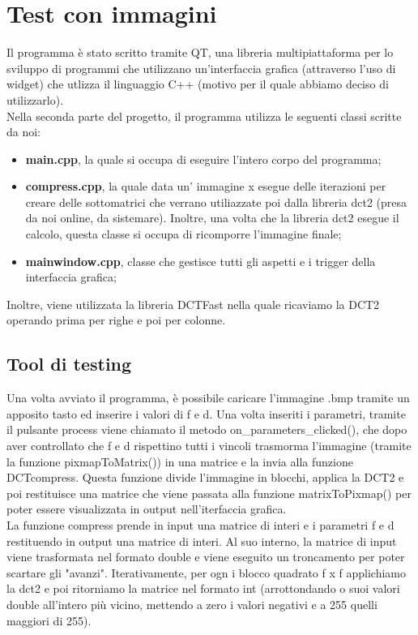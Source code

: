 \documentclass[a4paper,12pt]{report}
\newcommand{\mychapter}[2]{
    \setcounter{chapter}{#1}
    \setcounter{section}{0}
    \chapter*{#2}
    \addcontentsline{toc}{chapter}{#2}
}
\begin{document}
\mychapter{2}{Test con immagini}
Il programma è stato scritto tramite QT, una libreria multipiattaforma per lo sviluppo di programmi che utilizzano un'interfaccia grafica (attraverso l'uso di widget) che utlizza il linguaggio C++ (motivo per il quale abbiamo deciso di utilizzarlo).\\
Nella seconda parte del progetto, il programma utilizza le seguenti classi scritte da noi:
\begin{itemize}
\item \textbf{main.cpp}, la quale si occupa di eseguire l'intero corpo del programma;
\item \textbf{compress.cpp}, la quale data un' immagine x esegue delle iterazioni per creare delle sottomatrici che verrano utiliazzate poi dalla libreria dct2 (presa da noi online, da sistemare). Inoltre, una volta che la libreria dct2 esegue il calcolo, questa classe si occupa di ricomporre l'immagine finale;
\item \textbf{mainwindow.cpp}, classe che gestisce tutti gli aspetti e i trigger della interfaccia grafica;
\end{itemize}
Inoltre, viene utilizzata la libreria DCTFast nella quale ricaviamo la DCT2 operando prima per righe e poi per colonne.\\
 
\section{Tool di testing}
Una volta avviato il programma, è possibile caricare l'immagine .bmp tramite un apposito tasto ed inserire i valori di f e d. Una volta inseriti i parametri, tramite il pulsante process viene chiamato il metodo on\_parameters\_clicked(), che dopo aver controllato che f e d rispettino tutti i vincoli trasmorma l'immagine (tramite la funzione pixmapToMatrix()) in una matrice e la invia alla funzione DCTcompress. Questa funzione divide l'immagine in blocchi, applica la DCT2 e poi restituisce una matrice che viene passata alla funzione matrixToPixmap() per poter essere visualizzata in output nell'iterfaccia grafica.\\
La funzione compress prende in input una matrice di interi e i parametri f e d restituendo in output una matrice di interi. Al suo interno, la matrice di input viene trasformata nel formato double e viene eseguito un troncamento per poter scartare gli "avanzi". Iterativamente, per ogn i blocco quadrato f x f applichiamo la dct2 e poi ritorniamo la matrice nel formato int (arrottondando o suoi valori double all'intero più vicino, mettendo a zero i valori negativi e a 255 quelli maggiori di 255). 
\end{document}
